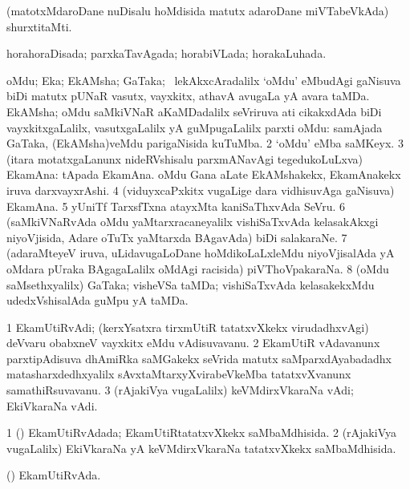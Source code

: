 \bentry
{}
\gl{\nA}
\expl{}
\bmng
(matotxMdaroDane nuDisalu hoMdisida matutx adaroDane miVTabeVkAda) shurxtitaMti. 
\emng
\eentry

\bentry
{} 
\gl{\gu}
\expl{}
\bmng
horahoraDisada; parxkaTavAgada; horabiVLada; horakaLuhada. 
\emng
\eentry

\bentry
{} 
\gl{\nA}
\expl{}
\bmng
\bnum
{} 
\banum
{} oMdu; Eka; EkAMsha; GaTaka; \kanmu\ lekAkxcAradalilx `oMdu' eMbudAgi gaNisuva biDi matutx pUNaR vasutx, vayxkitx, athavA avugaLa yA avara taMDa. 
 EkAMsha; oMdu saMkiVNaR aKaMDadalilx seVriruva ati cikakxdAda biDi vayxkitxgaLalilx, vasutxgaLalilx yA guMpugaLalilx parxti oMdu:  samAjada GaTaka, (EkAMsha)veMdu parigaNisida kuTuMba. 
\eanum
\numie
\num{2} `oMdu' eMba saMKeyx. 
\num{3} (itara motatxgaLanunx nideRVshisalu parxmANavAgi tegedukoLuLxva) EkamAna:  tApada EkamAna.  oMdu Gana aLate EkAMshakekx, EkamAnakekx iruva darxvayxrAshi. 
\num{4} (viduyxcaPxkitx \mo vugaLige dara vidhisuvAga gaNisuva) EkamAna. 
\num{5} yUniTf TarxsfTxna atayxMta kaniSaThxvAda SeVru. 
\num{6} (saMkiVNaRvAda oMdu yaMtarxracaneyalilx vishiSaTxvAda kelasakAkxgi niyoVjisida, Adare oTuTx yaMtarxda BAgavAda) biDi salakaraNe. 
\num{7} (adaraMteyeV iruva, uLidavugaLoDane hoMdikoLaLxleMdu niyoVjisalAda yA oMdara pUraka BAgagaLalilx oMdAgi racisida) piVThoVpakaraNa. 
\num{8} (oMdu saMsethxyalilx) GaTaka; visheVSa taMDa; vishiSaTxvAda kelasakekxMdu udedxVshisalAda guMpu yA taMDa. 
\enum
\emng
\eentry

\bentry
{} 
\gl{\nA}
\expl{}
\bmng
\bnum
\num{1} EkamUtiRvAdi; (kerxYsatxra tirxmUtiR tatatxvXkekx virudadhxvAgi) deVvaru obabxneV vayxkitx eMdu vAdisuvavanu. 
\num{2} EkamUtiR vAdavanunx parxtipAdisuva dhAmiRka saMGakekx seVrida matutx saMparxdAyabadadhx matasharxdedhxyalilx sAvxtaMtarxyXvirabeVkeMba tatatxvXvanunx samathiRsuvavanu. 
\num{3} (rAjakiVya \mo vugaLalilx) keVMdirxVkaraNa vAdi; EkiVkaraNa vAdi. 
\enum
\emng
\eentry

\bentry
{} 
\gl{\gu}
\expl{}
\bmng
\bnum
\num{1} (\kerxY) EkamUtiRvAdada; EkamUtiRtatatxvXkekx saMbaMdhisida. 
\num{2} (rAjakiVya \mo vugaLalilx) EkiVkaraNa yA keVMdirxVkaraNa tatatxvXkekx saMbaMdhisida. 
\enum
\emng
\eentry

\bentry
{} 
\gl{\nA}
\expl{}
\bmng
(\kerxY) EkamUtiRvAda. 
\emng
\eentry

